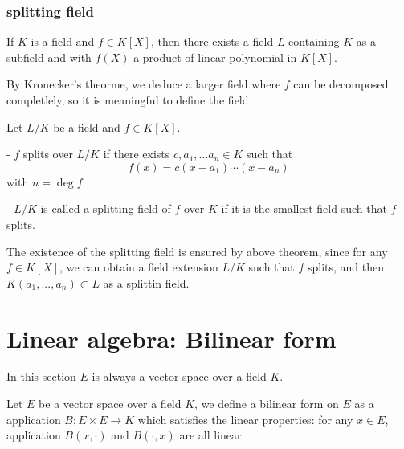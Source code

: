 \documentclass[en,geye,blue,normal,12pt]{elegantnote}
\begin{document}
\subsubsection{splitting field}

\begin{theorem}[Kronecker] If \(K\) is a field and \(f \in K[X]\), then there exists a field \(L\) containing \(K\) as a subfield and with \(f(X)\) a product of linear polynomial in \(K[X]\).

By Kronecker's theorme, we deduce a larger field where \(f\) can be decomposed completlely, so it is meaningful to define the field
\begin{definition}
  Let \(L/K\) be a field and \(f \in K[X]\).

  - \(f\) splits over \(L/K\) if there exists \(c,a_1,...a_n \in K\) such that
  \[f(x) = c(x-a_1)\cdots(x-a_n)\]
  with \(n = \deg f\).

  - \(L/K\) is called a splitting field of \(f\) over \(K\) if it is the smallest field such that \(f\) splits.
\end{definition}
  
The existence of the splitting field is ensured by above theorem, since for any \(f \in K[X]\), we can obtain a field extension \(L/K\) such that \(f\) splits, and then \(K(a_1,...,a_n) \subset L\) as a splittin field.
\end{theorem}

\newpage

\section{Linear algebra: Bilinear form}

In this section \(E\) is always a vector space over a field \(K\).

\begin{definition}
  Let \(E\) be a vector space over a field \(K\), we define a bilinear form on \(E\) as a application \(B:E \times E \to K\) which satisfies the linear properties: for any \(x \in E\), application \(B(x,\cdot)\) and \(B(\cdot,x)\) are all linear.
\end{definition}
\end{document}
